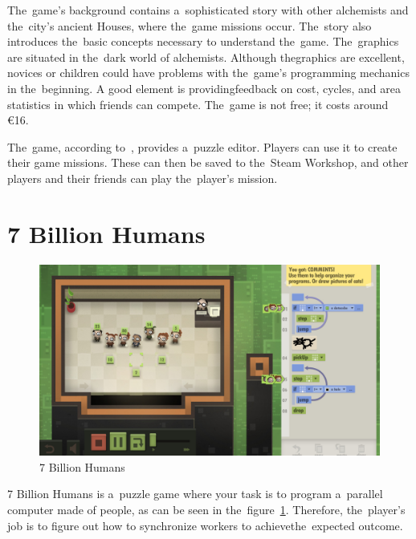 The~game's background contains a~sophisticated story with other alche\-mists and the~city's ancient Houses, where the~game missions occur.
The~story also introduces the~basic concepts necessary to understand the~game.
\linebreak
The~graphics are situated in the~dark world of alchemists.
Although the\linebreak{}graphics are excellent, novices or children could have problems with the~game's programming mechanics in the~beginning.
A good element is providing\linebreak{}feedback on cost, cycles, and area statistics in which friends can compete.
The~game is not free; it costs around €16.

The~game, according to~\cite{a2022_zachtronics}, provides a~puzzle editor.
Players can use it to create their game missions.
These can then be saved to the~Steam Workshop, and other players and their friends can play the~player's mission.

\pagebreak
\section{7 Billion Humans}
\label{similar-games:7-billion-humans}

\begin{figure}
    \centering
    \includegraphics[width=1\linewidth]{assets/similar-games/7bilionhumans.jpg}
    \caption{7 Billion Humans~\cite{a2022_tomorrow}}
    \label{fig:7bilionhumans}
\end{figure}

7 Billion Humans is a~puzzle game where your task is to program a~parallel computer made of people, as can be seen in the~figure~\ref{fig:7bilionhumans}.
\mbox{Therefore}, the~player's job is to figure out how to synchronize workers to achieve\linebreak{}the~expected outcome.

